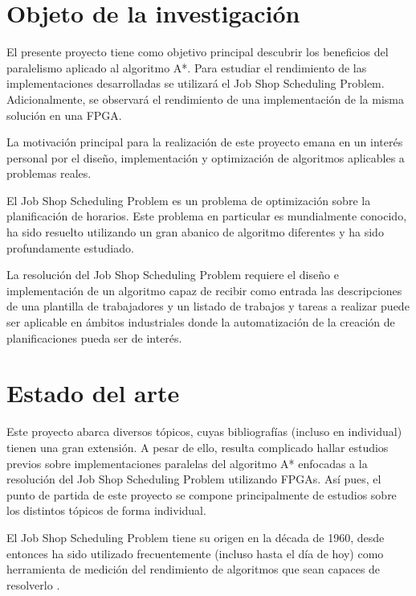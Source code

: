 
\section{Objeto de la investigación}

El presente proyecto tiene como objetivo principal descubrir los
beneficios del paralelismo aplicado al algoritmo A*.
Para estudiar el rendimiento de las implementaciones desarrolladas
se utilizará el Job Shop Scheduling Problem.
Adicionalmente, se observará el rendimiento de una implementación
de la misma solución en una FPGA.

La motivación principal para la realización de este proyecto
emana en un interés personal por el diseño, implementación y optimización
de algoritmos aplicables a problemas reales.

El Job Shop Scheduling Problem es un problema de optimización
sobre la planificación de horarios.
Este problema en particular es mundialmente conocido,
ha sido resuelto utilizando un gran abanico de algoritmo diferentes
y ha sido profundamente estudiado.

La resolución del Job Shop Scheduling Problem requiere el diseño e implementación de
un algoritmo capaz de recibir como entrada las descripciones de una plantilla
de trabajadores y un listado de trabajos y tareas a realizar puede ser
aplicable en ámbitos industriales donde la automatización de la creación
de planificaciones pueda ser de interés.

\section{Estado del arte}

Este proyecto abarca diversos tópicos, cuyas bibliografías
(incluso en individual) tienen una gran extensión.
A pesar de ello, resulta complicado hallar estudios previos sobre implementaciones
paralelas del algoritmo A* enfocadas a la resolución del Job Shop Scheduling Problem
utilizando FPGAs.
Así pues, el punto de partida de este proyecto
se compone principalmente de estudios
sobre los distintos tópicos de forma individual.

El Job Shop Scheduling Problem tiene su origen en la década de 1960,
desde entonces ha sido utilizado frecuentemente (incluso hasta el día de hoy)
como herramienta de medición del rendimiento de algoritmos que sean 
capaces de resolverlo \cite{Man67}.

